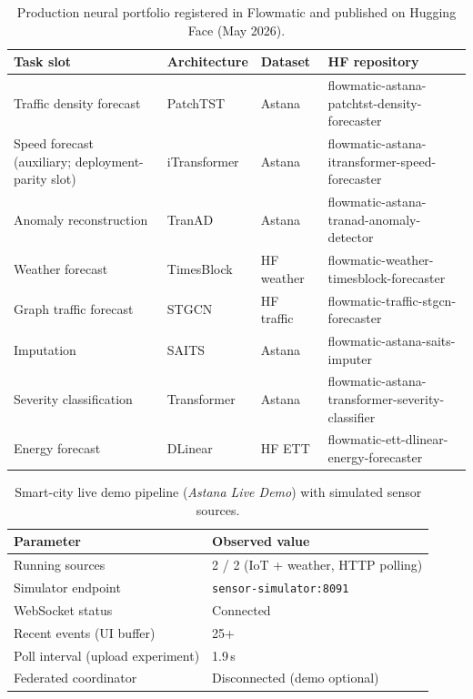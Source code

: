 \begin{table}[H]
  \centering
  \caption{Production neural portfolio registered in Flowmatic and published on Hugging Face (May 2026).}
  \label{tab:production-portfolio}
  \footnotesize
  \setlength{\tabcolsep}{4pt}
  \begin{tabularx}{\linewidth}{@{}>{\raggedright\arraybackslash}p{2.2cm} l l >{\raggedright\arraybackslash\ttfamily}X@{}}
    \toprule
    \textbf{Task slot} & \textbf{Architecture} & \textbf{Dataset} & \textbf{HF repository} \\
    \midrule
    Traffic density forecast & PatchTST & Astana & flowmatic-astana-patchtst-density-forecaster \\
    Speed forecast (auxiliary; deployment-parity slot) & iTransformer & Astana & flowmatic-astana-itransformer-speed-forecaster \\
    Anomaly reconstruction & TranAD & Astana & flowmatic-astana-tranad-anomaly-detector \\
    Weather forecast & TimesBlock & HF weather & flowmatic-weather-timesblock-forecaster \\
    Graph traffic forecast & STGCN & HF traffic & flowmatic-traffic-stgcn-forecaster \\
    Imputation & SAITS & Astana & flowmatic-astana-saits-imputer \\
    Severity classification & Transformer & Astana & flowmatic-astana-transformer-severity-classifier \\
    Energy forecast & DLinear & HF ETT & flowmatic-ett-dlinear-energy-forecaster \\
    \bottomrule
  \end{tabularx}
\end{table}

\begin{table}[H]
  \centering
  \caption{Smart-city live demo pipeline (\emph{Astana Live Demo}) with simulated sensor sources.}
  \label{tab:smart-city-live-demo}
  \begin{tabular}{@{}ll@{}}
    \toprule
    \textbf{Parameter} & \textbf{Observed value} \\
    \midrule
    Running sources & 2 / 2 (IoT + weather, HTTP polling) \\
    Simulator endpoint & \texttt{sensor-simulator:8091} \\
    WebSocket status & Connected \\
    Recent events (UI buffer) & 25+ \\
    Poll interval (upload experiment) & 1.9\,s \\
    Federated coordinator & Disconnected (demo optional) \\
    \bottomrule
  \end{tabular}
\end{table}
